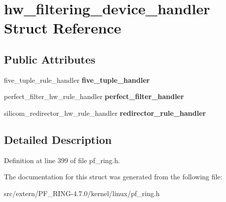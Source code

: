 \hypertarget{structhw__filtering__device__handler}{
\section{hw\_\-filtering\_\-device\_\-handler Struct Reference}
\label{structhw__filtering__device__handler}
}
\subsection*{Public Attributes}
\begin{DoxyCompactItemize}
\item 
\hypertarget{structhw__filtering__device__handler_a6a373ba6308de9d2db23a8d0d171c19f}{
five\_\-tuple\_\-rule\_\-handler {\bfseries five\_\-tuple\_\-handler}}
\label{structhw__filtering__device__handler_a6a373ba6308de9d2db23a8d0d171c19f}

\item 
\hypertarget{structhw__filtering__device__handler_aa03cde8c4a3521c8232603da7d0cd107}{
perfect\_\-filter\_\-hw\_\-rule\_\-handler {\bfseries perfect\_\-filter\_\-handler}}
\label{structhw__filtering__device__handler_aa03cde8c4a3521c8232603da7d0cd107}

\item 
\hypertarget{structhw__filtering__device__handler_a1decfab73b9781b6507db257cd0aa225}{
silicom\_\-redirector\_\-hw\_\-rule\_\-handler {\bfseries redirector\_\-rule\_\-handler}}
\label{structhw__filtering__device__handler_a1decfab73b9781b6507db257cd0aa225}

\end{DoxyCompactItemize}


\subsection{Detailed Description}


Definition at line 399 of file pf\_\-ring.h.



The documentation for this struct was generated from the following file:\begin{DoxyCompactItemize}
\item 
src/extern/PF\_\-RING-\/4.7.0/kernel/linux/pf\_\-ring.h\end{DoxyCompactItemize}

